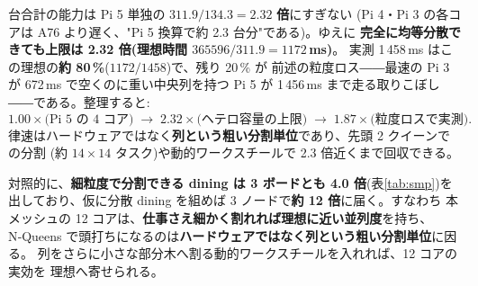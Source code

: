  台合計の能力は Pi 5 単独の $311.9/134.3 = \mathbf{2.32}$\textbf{ 倍}にすぎない
(Pi 4・Pi 3 の各コアは A76 より遅く、"Pi 5 換算で約 2.3 台分"である)。ゆえに
\textbf{完全に均等分散できても上限は 2.32 倍(理想時間 $365596/311.9 = 1172$\,ms)}。
実測 1\,458\,ms はこの理想の\textbf{約 80\,\%}($1172/1458$)で、残り 20\,\% が
前述の粒度ロス――最速の Pi 3 が 672\,ms で空くのに重い中央列を持つ Pi 5 が
1\,456\,ms まで走る取りこぼし――である。整理すると:
\[
1.00\times\text{(Pi 5 の 4 コア)}\;\longrightarrow\;
2.32\times\text{(ヘテロ容量の上限)}\;\longrightarrow\;
1.87\times\text{(粒度ロスで実測)}.
\]
律速はハードウェアではなく\textbf{列という粗い分割単位}であり、先頭 2 クイーンでの分割
(約 $14\times14$ タスク)や動的ワークスチールで 2.3 倍近くまで回収できる。

\medskip\noindent
対照的に、\textbf{細粒度で分割できる dining は 3 ボードとも 4.0 倍}(表\ref{tab:smp})を
出しており、仮に分散 dining を組めば 3 ノードで\textbf{約 12 倍}に届く。すなわち
本メッシュの 12 コアは、\textbf{仕事さえ細かく割れれば理想に近い並列度}を持ち、
N‑Queens で頭打ちになるのは\textbf{ハードウェアではなく列という粗い分割単位}に因る。
列をさらに小さな部分木へ割る動的ワークスチールを入れれば、12 コアの実効を
理想へ寄せられる。

